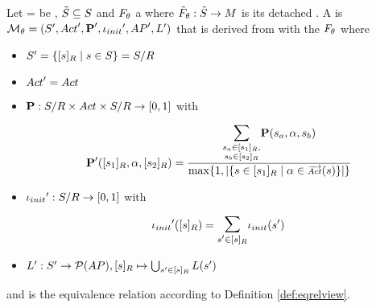 \documentclass[preview]{standalone}
\begin{document}
\begin{definition}
	
	Let \chgph = \chgphtuple be \chgphN, ${\tilde{{S}}} \subseteq {S}$ and ${F_{{\theta}}}$ a \grpfctN where ${\tilde{F}_{{\theta}}} : {\tilde{{S}}} \to {\ensuremath{{M}}}$ is its detached \grpfctN. A \emph{\viewN} is \achgphN ${{{{\mathcal{M}}}}_{{\theta}}} = {{({S}', {Act}', {\textbf{P}}', {\iota_{init}}', {AP}', {L}')}}$ that is derived from \mdp with the \grpfctN ${F_{{\theta}}}$ where
	
	\begin{itemize}
				\item ${S}' = \{ {[{s}]_{{R}}} \mid {s} \in {S} \} = {{{S}}/{R}}$
				
				\item ${Act}' = {Act}$
				
				
				\item ${\textbf{P}} : {{{S}}/{R}} \times {Act} \times {{\ensuremath{{S}}}/\ensuremath{{R}}} \to [0,1]$ with 
				\[ 
				\probtfunc'(\eqclassv[\state_1], \action, \eqclassv[\state_2]) = 
				\frac
				{\bbigsum{\substack{\state_a \in \eqclassv[\state_1], \\ \state_b \in \eqclassv[\state_2]}}\probtfunc(\state_a, \action, \state_b) }
				{
					\max\{1,|\{\state \in \eqclassv[\state_1] \mid \action \in \outacts(\state)\}|\}
					}
				\]
				
				
				\item ${\iota_{init}}' : {{{S}}/{R}} \to [0,1]$ with 
				\[
				\initdistrib'(\eqclassv) = \bbigsum{\state' \in \eqclassv} \initdistrib(\state')
				\]
							
				\item ${L}': {S}' \to {\mathcal{P}(\ensuremath{{AP}})}, {{[{s}]_{{R}}}} \mapsto \bigcup_{{s}' \in {\ensuremath{{[{s}]_{{R}}}}}} {L}({s}')$
				
			\end{itemize}
	and \eqrelview is the equivalence relation according to Definition \ref{def:eqrelview}.
	

	\label{def:view}	
\end{definition}
\end{document}
